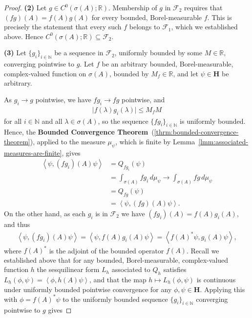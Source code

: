 \begin{proof}
\textbf{(2)} Let $g \in C^0(\sigma(A); \mathbb{R})$. Membership of $g$ in $\mathcal{F}_2$ requires that $(fg)(A) = f(A)g(A)$ for every bounded, Borel-measurable $f$. This is precisely the statement that every such $f$ belongs to $\mathcal{F}_1$, which we established above. Hence $C^0(\sigma(A); \mathbb{R}) \subseteq \mathcal{F}_2$.

\textbf{(3)} Let $\{ g_i \}_{i \in \mathbb{N}}$ be a sequence in $\mathcal{F}_2$, uniformly bounded by some $M \in \mathbb{R}$, converging pointwise to $g$. Let $f$ be an arbitrary bounded, Borel-measurable, complex-valued function on $\sigma(A)$, bounded by $M_f \in \mathbb{R}$, and let $\psi \in \mathbf{H}$ be arbitrary.

As $g_i \rightarrow g$ pointwise, we have $fg_i \rightarrow fg$ pointwise, and
\begin{align}
    \lvert f(\lambda)g_i(\lambda) \rvert \le M_f M
\end{align}
for all $i \in \mathbb{N}$ and all $\lambda \in \sigma(A)$, so the sequence $\{ fg_i \}_{i \in \mathbb{N}}$ is uniformly bounded. Hence, the \textbf{Bounded Convergence Theorem}~(\ref{thrm:bounded-convergence-theorem}), applied to the measure $\mu_\psi$, which is finite by Lemma~\ref{lmm:associated-measures-are-finite}, gives 
\begin{align}
    \left< \psi, (fg_i)(A)\psi \right> &= Q_{fg_i}(\psi) \\
                &= \int_{\sigma(A)} fg_i \, d\mu_\psi \longrightarrow \int_{\sigma(A)} fg \, d\mu_\psi \\
                &= Q_{fg}(\psi) \\
                &= \left< \psi, (fg)(A)\psi \right>.
\end{align}
On the other hand, as each $g_i$ is in $\mathcal{F}_2$ we have $(fg_i)(A) = f(A)g_i(A)$, and thus
\begin{align}
    \left< \psi, (fg_i)(A)\psi \right> = \left< \psi, f(A)g_i(A)\psi \right> = \left< f(A)^*\psi, g_i(A)\psi \right>,
\end{align}
where $f(A)^*$ is the adjoint of the bounded operator $f(A)$. Recall we established above that for any bounded, Borel-measurable, complex-valued function $h$ the sesquilinear form $L_h$ associated to $Q_h$ satisfies $L_h(\phi, \psi) = \left< \phi, h(A)\psi \right>$, and that the map $h \mapsto L_h(\phi, \psi)$ is continuous under uniformly bounded pointwise convergence for any $\phi, \psi \in \mathbf{H}$. Applying this with $\phi = f(A)^*\psi$ to the uniformly bounded sequence $\{ g_i \}_{i \in \mathbb{N}}$ converging pointwise to $g$ gives

\end{proof}
